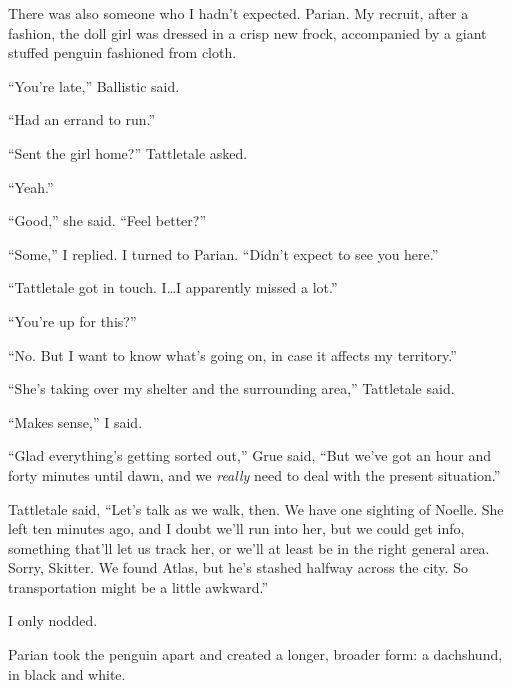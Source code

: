 There was also someone who I hadn't expected.  Parian.  My recruit, after a fashion, the doll girl was dressed in a crisp new frock, accompanied by a giant stuffed penguin fashioned from cloth.



``You're late,'' Ballistic said.



``Had an errand to run.''



``Sent the girl home?'' Tattletale asked.



``Yeah.''



``Good,'' she said.  ``Feel better?''



``Some,'' I replied.  I turned to Parian.  ``Didn't expect to see you here.''



``Tattletale got in touch.  I\ldots I apparently missed a lot.''



``You're up for this?''



``No.  But I want to know what's going on, in case it affects my territory.''



``She's taking over my shelter and the surrounding area,'' Tattletale said.



``Makes sense,'' I said.



``Glad everything's getting sorted out,'' Grue said, ``But we've got an hour and forty minutes until dawn, and we \emph{really} need to deal with the present situation.''



Tattletale said, ``Let's talk as we walk, then.  We have one sighting of Noelle.  She left ten minutes ago, and I doubt we'll run into her, but we could get info, something that'll let us track her, or we'll at least be in the right general area.  Sorry, Skitter.  We found Atlas, but he's stashed halfway across the city.  So transportation might be a little awkward.''



I only nodded.



Parian took the penguin apart and created a longer, broader form: a dachshund, in black and white.



